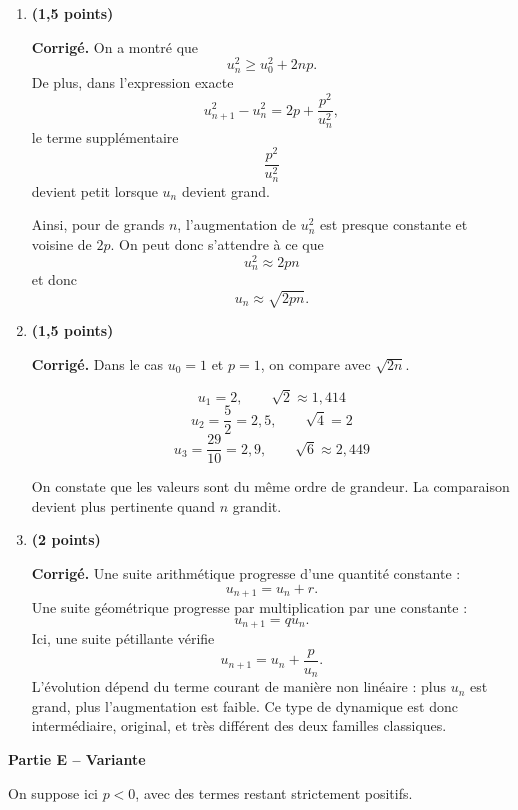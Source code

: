 \documentclass[11pt,a4paper]{article}
\newcommand{\bareme}[1]{\hfill{\color{blue!70!black}\textbf{(#1 points)}}}
\newcommand{\corr}{\noindent\textcolor{blue!70!black}{\textbf{Corrigé. }}}
\begin{document}
\begin{enumerate}[label=\textbf{D.\arabic*.}, leftmargin=0.9cm]

\item \bareme{1,5}

\corr On a montré que
\[
u_n^2\geq u_0^2+2np.
\]
De plus, dans l’expression exacte
\[
u_{n+1}^2-u_n^2=2p+\frac{p^2}{u_n^2},
\]
le terme supplémentaire
\[
\frac{p^2}{u_n^2}
\]
devient petit lorsque $u_n$ devient grand.

Ainsi, pour de grands $n$, l’augmentation de $u_n^2$ est presque constante et voisine de $2p$. On peut donc s’attendre à ce que
\[
u_n^2\approx 2pn
\]
et donc
\[
\boxed{u_n\approx \sqrt{2pn}.}
\]

\item \bareme{1,5}

\corr Dans le cas $u_0=1$ et $p=1$, on compare avec $\sqrt{2n}$.

\[
u_1=2,\qquad \sqrt{2}\approx 1{,}414
\]
\[
u_2=\frac52=2{,}5,\qquad \sqrt{4}=2
\]
\[
u_3=\frac{29}{10}=2{,}9,\qquad \sqrt{6}\approx 2{,}449
\]

On constate que les valeurs sont du même ordre de grandeur. La comparaison devient plus pertinente quand $n$ grandit.

\item \bareme{2}

\corr Une suite arithmétique progresse d’une quantité constante :
\[
u_{n+1}=u_n+r.
\]
Une suite géométrique progresse par multiplication par une constante :
\[
u_{n+1}=qu_n.
\]
Ici, une suite pétillante vérifie
\[
u_{n+1}=u_n+\frac{p}{u_n}.
\]
L’évolution dépend du terme courant de manière non linéaire : plus $u_n$ est grand, plus l’augmentation est faible. Ce type de dynamique est donc intermédiaire, original, et très différent des deux familles classiques.

\end{enumerate}

\medskip

\textbf{Partie E -- Variante}

On suppose ici $p<0$, avec des termes restant strictement positifs.
\end{document}
